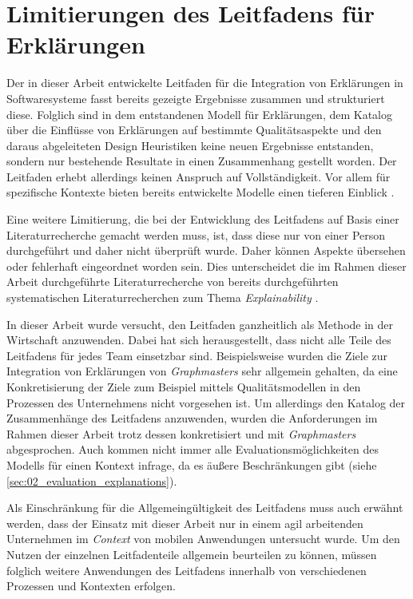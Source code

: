 \section{Limitierungen des Leitfadens für Erklärungen}

Der in dieser Arbeit entwickelte Leitfaden für die Integration von Erklärungen in Softwaresysteme fasst bereits gezeigte Ergebnisse zusammen und strukturiert diese. Folglich sind in dem entstandenen Modell für Erklärungen, dem Katalog über die Einflüsse von Erklärungen auf bestimmte Qualitätsaspekte und den daraus abgeleiteten Design Heuristiken keine neuen Ergebnisse entstanden, sondern nur bestehende Resultate in einen Zusammenhang gestellt worden. 
Der Leitfaden erhebt allerdings keinen Anspruch auf Vollständigkeit. Vor allem für spezifische Kontexte bieten bereits entwickelte Modelle einen tieferen Einblick \cite{nunes_systematic_2017, sokol_explainability_2020}.

Eine weitere Limitierung, die bei der Entwicklung des Leitfadens auf Basis einer Literaturrecherche gemacht werden muss, ist, dass diese nur von einer Person durchgeführt und daher nicht überprüft wurde. Daher können Aspekte übersehen oder fehlerhaft eingeordnet worden sein. Dies unterscheidet die im Rahmen dieser Arbeit durchgeführte Literaturrecherche von bereits durchgeführten systematischen Literaturrecherchen zum Thema \textit{Explainability} \cite[vgl.][]{nunes_systematic_2017,chazette_knowledge_nodate}.

In dieser Arbeit wurde versucht, den Leitfaden ganzheitlich als Methode in der Wirtschaft anzuwenden. Dabei hat sich herausgestellt, dass nicht alle Teile des Leitfadens für jedes Team einsetzbar sind. Beispielsweise wurden die Ziele zur Integration von Erklärungen von \textit{Graphmasters} sehr allgemein gehalten, da eine Konkretisierung der Ziele zum Beispiel mittels Qualitätsmodellen \cite{schneider2012abenteuer} in den Prozessen des Unternehmens nicht vorgesehen ist. Um allerdings den Katalog der Zusammenhänge des Leitfadens anzuwenden, wurden die Anforderungen im Rahmen dieser Arbeit trotz dessen konkretisiert und mit \textit{Graphmasters} abgesprochen. Auch kommen nicht immer alle Evaluationsmöglichkeiten des Modells für einen Kontext infrage, da es äußere Beschränkungen gibt (siehe \autoref{sec:02_evaluation_explanations}).

Als Einschränkung für die Allgemeingültigkeit des Leitfadens muss auch erwähnt werden, dass der Einsatz mit dieser Arbeit nur in einem agil arbeitenden Unternehmen im \textit{Context} von mobilen Anwendungen untersucht wurde. Um den Nutzen der einzelnen Leitfadenteile allgemein beurteilen zu können, müssen folglich weitere Anwendungen des Leitfadens innerhalb von verschiedenen Prozessen und Kontexten erfolgen.

